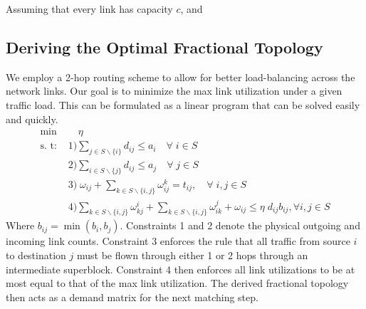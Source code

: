 \documentclass[sigconf]{acmart}
\begin{document}


Assuming that every link has capacity $c$, and 

\subsection{Deriving the Optimal Fractional Topology}
We employ a 2-hop routing scheme to allow for better load-balancing across the network links. Our goal is to minimize the max link utilization under a given traffic load. This can be formulated as a linear program that can be solved easily and quickly. 
\begin{equation}\label{fractional_graph}
\begin{aligned}
\min \;& \quad \eta \\
\text{s. t: } & 1) \sum_{j \in S \backslash \{i\}} d_{ij} \leq a_i \quad \forall \; i \in S\\
& 2) \sum_{i \in S \backslash \{j\}} d_{ij} \leq a_j \quad \forall \; j \in S \\
& 3) \; \omega_{ij} + \sum_{k \in S \backslash \{i, j\}} \omega_{ij}^k = t_{ij}, \quad \forall \; i, j \in S \\
& 4) \sum_{k \in S \backslash \{i, j\}} \omega_{kj}^i  + \sum_{k \in S \backslash \{i, j\}} \omega_{ik}^j + \omega_{ij} \leq \eta \; d_{ij} b_{ij}, \forall i, j \in S
\end{aligned}
\end{equation}
Where $b_{ij} = \min(b_i, b_j)$. Constraints 1 and 2 denote the physical outgoing and incoming link counts. Constraint 3 enforces the rule that all traffic from source $i$ to destination $j$ must be flown through either 1 or 2 hops through an intermediate superblock. Constraint 4 then enforces all link utilizations to be at most equal to that of the max link utilization. The derived fractional topology then acts as a demand matrix for the next matching step.
\end{document}
